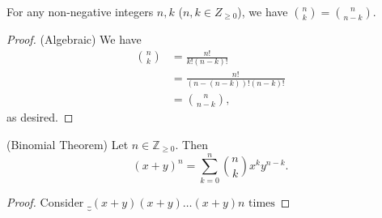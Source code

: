 \begin{lemma}
	For any non-negative integers \( n,k \) (\( n,k \in Z_{\ge 0} \)), we have \( \binom{n}{k} = \binom{n}{n-k} \).
\end{lemma}
\begin{proof}
	(Algebraic) We have 
	\begin{align*}
		\binom{n}{k} &= \frac{n!}{k!(n-k)!} \\
								 &= \frac{n!}{(n-(n-k))!(n-k)!} \\
								 &= \binom{n}{n-k}
	,\end{align*} as desired.
\end{proof}

\begin{theorem}
	(Binomial Theorem) Let \( n \in \mathbb{Z}_{\ge 0}\). Then \[
		(x+y)^n = \sum_{k=0}^{n} \binom{n}{k} x^k y^{n-k}
	.\] 
\end{theorem}
\begin{proof}
	Consider \( \underbrace_{(x+y)(x+y)\ldots (x+y)}{n \text{ times}} \)
\end{proof}
